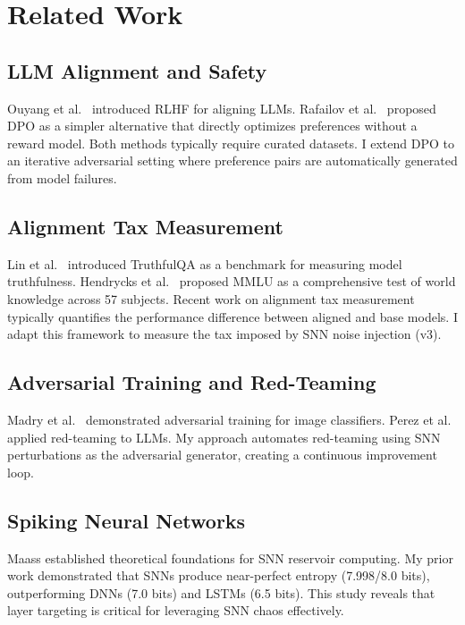 \documentclass[11pt,a4paper]{article}
\begin{document}
\section{Related Work}

\subsection{LLM Alignment and Safety}
Ouyang et al.\ \cite{ouyang2022training} introduced RLHF for aligning LLMs. Rafailov et al.\ \cite{rafailov2023dpo} proposed DPO as a simpler alternative that directly optimizes preferences without a reward model. Both methods typically require curated datasets. I extend DPO to an iterative adversarial setting where preference pairs are automatically generated from model failures.

\subsection{Alignment Tax Measurement}
Lin et al.\ \cite{lin2022truthfulqa} introduced TruthfulQA as a benchmark for measuring model truthfulness. Hendrycks et al.\ \cite{hendrycks2021mmlu} proposed MMLU as a comprehensive test of world knowledge across 57 subjects. Recent work on alignment tax measurement \cite{askell2021general} typically quantifies the performance difference between aligned and base models. I adapt this framework to measure the tax imposed by SNN noise injection (v3).

\subsection{Adversarial Training and Red-Teaming}
Madry et al.\ \cite{madry2018towards} demonstrated adversarial training for image classifiers. Perez et al.\ \cite{perez2022redteaming} applied red-teaming to LLMs. My approach automates red-teaming using SNN perturbations as the adversarial generator, creating a continuous improvement loop.

\subsection{Spiking Neural Networks}
Maass \cite{maass2002} established theoretical foundations for SNN reservoir computing. My prior work \cite{funasaki2026comprypto} demonstrated that SNNs produce near-perfect entropy (7.998/8.0 bits), outperforming DNNs (7.0 bits) and LSTMs (6.5 bits). This study reveals that layer targeting is critical for leveraging SNN chaos effectively.
\end{document}

